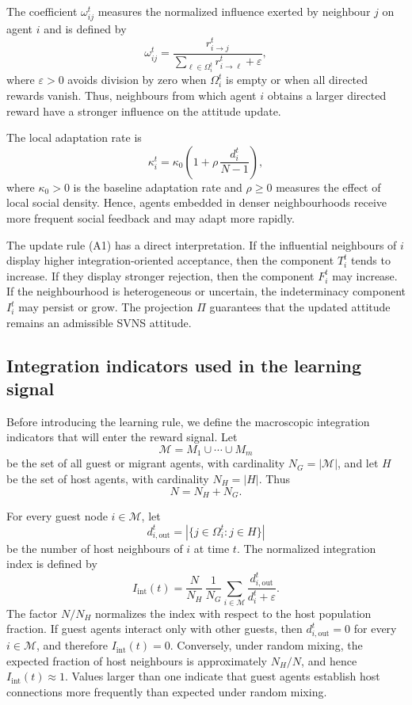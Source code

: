 \documentclass[11pt,a4paper]{article}
\begin{document}
The coefficient $\omega_{ij}^t$ measures the normalized influence exerted by
neighbour $j$ on agent $i$ and is defined by
\[
\omega_{ij}^t
=
\frac{r_{i\to j}^t}
{\displaystyle\sum_{\ell\in\Omega_i^t} r_{i\to \ell}^t+\varepsilon},
\tag{A2}
\]
where $\varepsilon>0$ avoids division by zero when $\Omega_i^t$ is empty or when
all directed rewards vanish. Thus, neighbours from which agent $i$ obtains a larger
directed reward have a stronger influence on the attitude update.

The local adaptation rate is
\[
\kappa_i^t
=
\kappa_0
\left(
1+\rho\,\frac{d_i^t}{N-1}
\right),
\tag{A3}
\]
where $\kappa_0>0$ is the baseline adaptation rate and $\rho\geq 0$ measures the
effect of local social density. Hence, agents embedded in denser neighbourhoods
receive more frequent social feedback and may adapt more rapidly.

The update rule (A1) has a direct interpretation. If the influential neighbours of
$i$ display higher integration-oriented acceptance, then the component $T_i^t$ tends
to increase. If they display stronger rejection, then the component $F_i^t$ may
increase. If the neighbourhood is heterogeneous or uncertain, the indeterminacy
component $I_i^t$ may persist or grow. The projection $\Pi$ guarantees that the
updated attitude remains an admissible SVNS attitude.

\subsection{Integration indicators used in the learning signal}

Before introducing the learning rule, we define the macroscopic integration
indicators that will enter the reward signal. Let
\[
\mathcal M = M_1\cup\cdots\cup M_m
\]
be the set of all guest or migrant agents, with cardinality $N_G=|\mathcal M|$,
and let $H$ be the set of host agents, with cardinality $N_H=|H|$. Thus
\[
N=N_H+N_G.
\]

For every guest node $i\in\mathcal M$, let
\[
d_{i,\mathrm{out}}^t
=
\left|\{j\in\Omega_i^t:j\in H\}\right|
\]
be the number of host neighbours of $i$ at time $t$. The normalized integration
index is defined by
\[
I_{\mathrm{int}}(t)
=
\frac{N}{N_H}\,
\frac{1}{N_G}
\sum_{i\in\mathcal M}
\frac{d_{i,\mathrm{out}}^t}{d_i^t+\varepsilon}.
\tag{A4}
\]
The factor $N/N_H$ normalizes the index with respect to the host population
fraction. If guest agents interact only with other guests, then
$d_{i,\mathrm{out}}^t=0$ for every $i\in\mathcal M$, and therefore
$I_{\mathrm{int}}(t)=0$. Conversely, under random mixing, the expected fraction of
host neighbours is approximately $N_H/N$, and hence $I_{\mathrm{int}}(t)\approx 1$.
Values larger than one indicate that guest agents establish host connections more
frequently than expected under random mixing.
\end{document}
